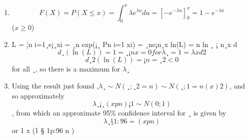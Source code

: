 \documentclass[a4paper,12pt]{article}
\begin{document}
\begin{enumerate}
    \item 
    
\[
F(X) = P(X \leq x) = \int^{x}_{0} \lambda e^{\lambda u} du
 = [-e^{-\lambda u}]^{x}_{0}  = 1-e^{-\lambda x}\] ($x \geq  0$)

\item  L = ¦n i=1¸e¡¸xi = ¸n exp(¡¸
Pn
i=1
xi) = ¸ne¡n¸x ln(L) = n ln ¸ ¡ n¸x
d
\[d¸ (\ln(L)) = 1=¸ ¡ nx = 0 for \lambda¸ = 1=\lambda x d2\]
\[d¸2 (\ln(L)) = ¡n=¸2 < 0 \]for all ¸, 
so there is a maximum for $\lambda$¸

\item  Using the result just found ,$\lambda¸ \sim N(¸; ¸2=n) \sim N(¸; 1=n(x)2)$, and so approximately
\[\lambda¸
¡¸
(x
p
n)¡1 \sim N(0; 1)\], from which an approximate 95\% confidence interval for ¸ is given by
\[\lambda¸
§ 1:96=(x
p
n)\] or 1
x (1 § 1p:96
n )
\end{enumerate}
\end{document}
